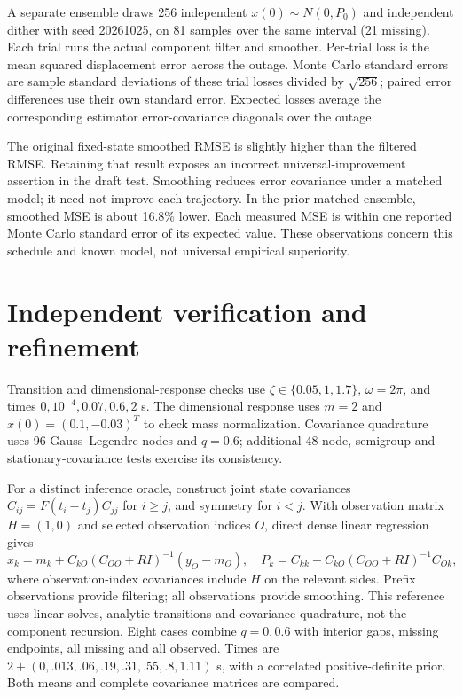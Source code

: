 \documentclass[10pt,a4paper]{article}
\begin{document}
A separate ensemble draws 256 independent $x(0)\sim N(0,P_0)$ and independent dither with seed 20261025, on 81 samples over the same interval (21 missing). Each trial runs the actual component filter and smoother. Per-trial loss is the mean squared displacement error across the outage. Monte Carlo standard errors are sample standard deviations of these trial losses divided by $\sqrt{256}$; paired error differences use their own standard error. Expected losses average the corresponding estimator error-covariance diagonals over the outage.

The original fixed-state smoothed RMSE is slightly higher than the filtered RMSE. Retaining that result exposes an incorrect universal-improvement assertion in the draft test. Smoothing reduces error covariance under a matched model; it need not improve each trajectory. In the prior-matched ensemble, smoothed MSE is about 16.8\% lower. Each measured MSE is within one reported Monte Carlo standard error of its expected value. These observations concern this schedule and known model, not universal empirical superiority.
\section{Independent verification and refinement}
Transition and dimensional-response checks use $\zeta\in\{0.05,1,1.7\}$, $\omega=2\pi$, and times $0,10^{-4},0.07,0.6,2$ s. The dimensional response uses $m=2$ and $x(0)=(0.1,-0.03)^T$ to check mass normalization. Covariance quadrature uses 96 Gauss--Legendre nodes and $q=0.6$; additional 48-node, semigroup and stationary-covariance tests exercise its consistency.

For a distinct inference oracle, construct joint state covariances $C_{ij}=F(t_i-t_j)C_{jj}$ for $i\geq j$, and symmetry for $i<j$. With observation matrix $H=(1,0)$ and selected observation indices $O$, direct dense linear regression gives
\[
 \widehat x_k=m_k+C_{kO}(C_{OO}+RI)^{-1}(y_O-m_O),\quad
 P_k=C_{kk}-C_{kO}(C_{OO}+RI)^{-1}C_{Ok},
\]
where observation-index covariances include $H$ on the relevant sides. Prefix observations provide filtering; all observations provide smoothing. This reference uses linear solves, analytic transitions and covariance quadrature, not the component recursion. Eight cases combine $q=0,0.6$ with interior gaps, missing endpoints, all missing and all observed. Times are $2+(0,.013,.06,.19,.31,.55,.8,1.11)$ s, with a correlated positive-definite prior. Both means and complete covariance matrices are compared.
\end{document}
